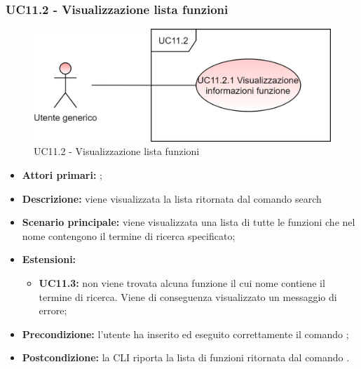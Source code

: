 \subsubsection{UC11.2 - Visualizzazione lista funzioni}
\begin{figure}[H]
	\centering
	\includegraphics[scale=\ucs]{./res/img/UC11.2.png}
	\caption {UC11.2 - Visualizzazione lista funzioni}
\end{figure}
\begin{itemize}
	\item \textbf{Attori primari:} \ua{};
	\item \textbf{Descrizione:} viene visualizzata la lista ritornata dal comando search
	\item \textbf{Scenario principale:} viene visualizzata una lista di tutte le funzioni che nel nome contengono il termine di ricerca specificato;
	\item \textbf{Estensioni:} 
	\begin{itemize}
		\item \textbf{UC11.3:} non viene trovata alcuna funzione il cui nome contiene il termine di ricerca. Viene di conseguenza visualizzato un messaggio di errore;
	\end{itemize}
	\item \textbf{Precondizione:} l’utente ha inserito ed eseguito correttamente il comando \search{};
	\item \textbf{Postcondizione:} la CLI riporta la lista di funzioni ritornata dal comando \search{}.
\end{itemize}